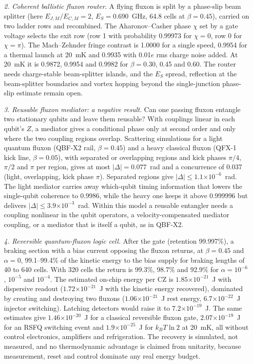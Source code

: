 \documentclass[10pt,twocolumn,letterpaper]{article}
\newcommand{\ee}[1]{\ensuremath{\times10^{#1}}}
\begin{document}
\emph{2. Coherent ballistic fluxon router.} A flying fluxon is split by a phase-slip beam splitter (here
$E_{J,M}/E_{C,M}=2$, $E_S=0.690$~GHz, 64.8 cells at $\beta=0.45$), carried on two ladder rows and recombined. The
Aharonov--Casher phase $\chi$ set by a gate voltage selects the exit row (row 1 with probability 0.99973 for $\chi=0$,
row 0 for $\chi=\pi$). The Mach--Zehnder fringe contrast is 1.0000 for a single speed, 0.9954 for a thermal launch at
20~mK and 0.9935 with 0.01$e$ rms charge noise added. At 20~mK it is 0.9872, 0.9954 and 0.9982 for $\beta=0.30$, 0.45
and 0.60. The router needs charge-stable beam-splitter islands, and the $E_S$ spread, reflection at the beam-splitter
boundaries and vortex hopping beyond the single-junction phase-slip estimate remain open.

\emph{3. Reusable fluxon mediator: a negative result.} Can one passing fluxon entangle two stationary qubits and leave
them reusable? With couplings linear in each qubit's $Z$, a mediator gives a conditional phase only at second order
and only where the two coupling regions overlap. Scattering simulations for a light
quantum fluxon (QBF-X2 rail, $\beta=0.45$) and a heavy classical fluxon (QFX-1 kick line, $\beta=0.05$), with separated
or overlapping regions and kick phases $\pi/4$, $\pi/2$ and $\pi$ per region, gives at most $|\Delta|=0.077$~rad and a
concurrence of 0.037 (light, overlapping, kick phase $\pi$). Separated regions give $|\Delta|\le1.1\ee{-6}$~rad. The
light mediator carries away which-qubit timing information that lowers the single-qubit coherence to 0.9986, while the
heavy one keeps it above 0.999996 but delivers $|\Delta|\le3.9\ee{-3}$~rad. Within this model a reusable entangler needs a
coupling nonlinear in the qubit operators, a velocity-compensated mediator coupling, or a mediator that is itself a
qubit, as in QBF-X2.

\emph{4. Reversible quantum-fluxon logic cell.} After the gate (retention 99.997\%), a braking section with a bias
current opposing the fluxon returns, at $\beta=0.45$ and $\alpha=0$, 99.1--99.4\% of the kinetic energy to the bias
supply for braking lengths of 40 to 640 cells. With 320 cells the return is 99.3\%, 98.7\% and 92.9\% for
$\alpha=10^{-6}$, $10^{-5}$ and $10^{-4}$. The estimated on-chip energy per CZ is $1.85\ee{-21}$~J with dispersive
readout ($1.72\ee{-21}$~J with the kinetic energy recovered), dominated by creating and destroying two fluxons
($1.06\ee{-21}$~J rest energy, $6.7\ee{-22}$~J injector switching). Latching detectors would raise it to
$7.2\ee{-19}$~J. The same estimates give $1.46\ee{-20}$~J for a classical reversible fluxon gate, $2.07\ee{-19}$~J for
an RSFQ switching event and $1.9\ee{-25}$~J for $k_BT\ln2$ at 20~mK, all without control electronics, amplifiers and
refrigeration. The recovery is simulated, not measured, and no thermodynamic advantage is claimed from unitarity,
because measurement, reset and control dominate any real energy budget.
\end{document}
